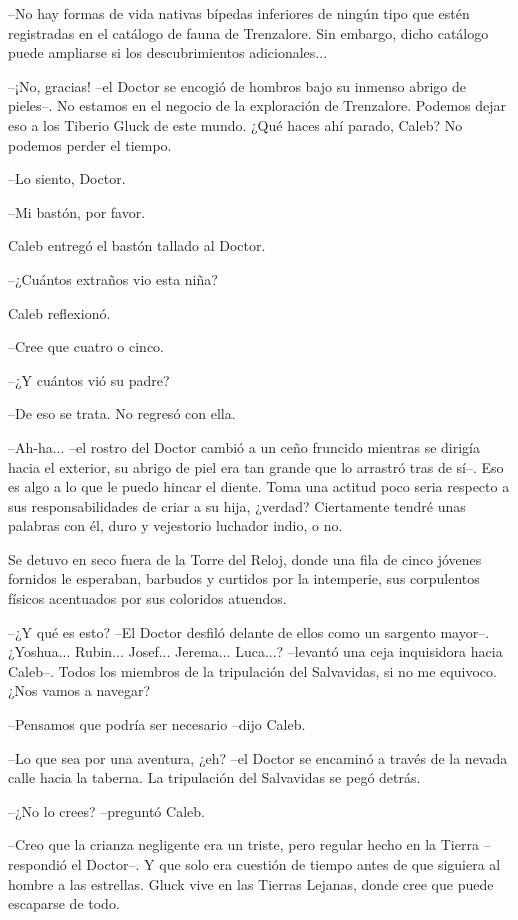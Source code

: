 --No hay formas de vida nativas bípedas inferiores de ningún tipo que estén registradas en el catálogo de fauna de Trenzalore. Sin embargo, dicho catálogo puede ampliarse si los descubrimientos adicionales...
 
--¡No, gracias! --el Doctor se encogió de hombros bajo su inmenso abrigo de pieles--. No estamos en el negocio de la exploración de Trenzalore. Podemos dejar eso a los Tiberio Gluck de este mundo. ¿Qué haces ahí parado, Caleb? No podemos perder el tiempo.
 
--Lo siento, Doctor.
 
--Mi bastón, por favor.
 
Caleb entregó el bastón tallado al Doctor.
 
--¿Cuántos extraños vio esta niña?
 
Caleb reflexionó.
 
--Cree que cuatro o cinco.
 
--¿Y cuántos vió su padre?
 
--De eso se trata. No regresó con ella.
 
--Ah-ha... --el rostro del Doctor cambió a un ceño fruncido mientras se dirigía hacia el exterior, su abrigo de piel era tan grande que lo arrastró tras de sí--. Eso es algo a lo que le puedo hincar el diente. Toma una actitud poco seria respecto a sus responsabilidades de criar a su hija, ¿verdad? Ciertamente tendré unas palabras con él, duro y vejestorio luchador indio, o no.
 
Se detuvo en seco fuera de la Torre del Reloj, donde una fila de cinco jóvenes fornidos le esperaban, barbudos y curtidos por la intemperie, sus corpulentos físicos acentuados por sus coloridos atuendos.
 
--¿Y qué es esto? --El Doctor desfiló delante de ellos como un sargento mayor--. ¿Yoshua... Rubin... Josef... Jerema... Luca...? --levantó una ceja inquisidora hacia Caleb--. Todos los miembros de la tripulación del Salvavidas, si no me equivoco. ¿Nos vamos a navegar?
 
--Pensamos que podría ser necesario --dijo Caleb.
 
--Lo que sea por una aventura, ¿eh? --el Doctor se encaminó a través de la nevada calle hacia la taberna. La tripulación del Salvavidas se pegó detrás.
 
--¿No lo crees? --preguntó Caleb.
 
--Creo que la crianza negligente era un triste, pero regular hecho en la Tierra --respondió el Doctor--. Y que solo era cuestión de tiempo antes de que siguiera al hombre a las estrellas. Gluck vive en las Tierras Lejanas, donde cree que puede escaparse de todo.
 

